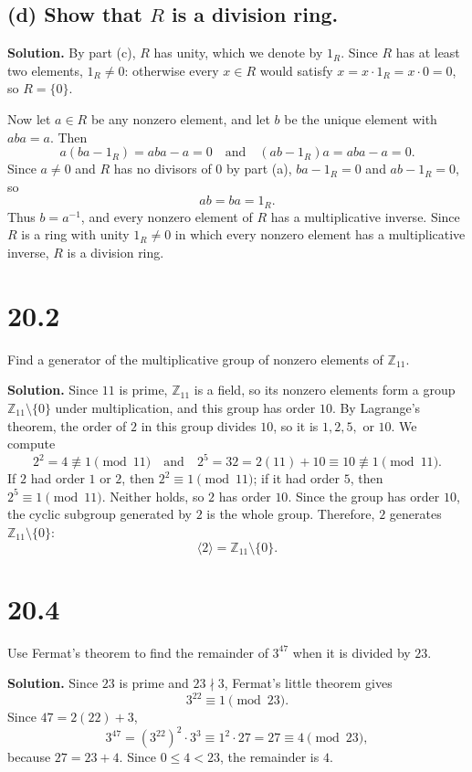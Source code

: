 \documentclass[11pt]{article}
\begin{document}
\subsection*{(d) Show that \(R\) is a division ring.}
\noindent\textbf{Solution.}
By part (c), \(R\) has unity, which we denote by \(1_R\).
Since \(R\) has at least two elements, \(1_R\neq0\): otherwise every
\(x\in R\) would satisfy \(x=x\cdot1_R=x\cdot0=0\), so \(R=\{0\}\).

Now let \(a\in R\) be any nonzero element, and let \(b\) be the unique
element with \(aba=a\). Then
\[
a(ba-1_R)=aba-a=0
\quad\text{and}\quad
(ab-1_R)a=aba-a=0.
\]
Since \(a\neq0\) and \(R\) has no divisors of \(0\) by part (a),
\(ba-1_R=0\) and \(ab-1_R=0\), so
\[
ab=ba=1_R.
\]
Thus \(b=a^{-1}\), and every nonzero element of \(R\) has a
multiplicative inverse. Since \(R\) is a ring with unity \(1_R\neq0\)
in which every nonzero element has a multiplicative inverse, \(R\) is a
division ring.

\section*{20.2}
Find a generator of the multiplicative group of nonzero elements
of \(\mathbb{Z}_{11}\).

\noindent\textbf{Solution.}
Since \(11\) is prime, \(\mathbb{Z}_{11}\) is a field, so its nonzero
elements form a group \(\mathbb{Z}_{11}\setminus\{0\}\) under
multiplication, and this group has order \(10\).
By Lagrange's theorem, the order of \(2\) in this group divides \(10\),
so it is \(1,2,5,\) or \(10\). We compute
\[
2^2=4\not\equiv1\pmod{11}
\quad\text{and}\quad
2^5=32=2(11)+10\equiv10\not\equiv1\pmod{11}.
\]
If \(2\) had order \(1\) or \(2\), then \(2^2\equiv1\pmod{11}\); if it had
order \(5\), then \(2^5\equiv1\pmod{11}\). Neither holds, so \(2\) has
order \(10\). Since the group has order \(10\), the cyclic subgroup
generated by \(2\) is the whole group. Therefore, \(2\) generates
\(\mathbb{Z}_{11}\setminus\{0\}\):
\[
\boxed{\langle 2\rangle=\mathbb{Z}_{11}\setminus\{0\}.}
\]

\section*{20.4}
Use Fermat's theorem to find the remainder of \(3^{47}\)
when it is divided by \(23\).

\noindent\textbf{Solution.}
Since \(23\) is prime and \(23\nmid3\), Fermat's little theorem gives
\[
3^{22}\equiv1\pmod{23}.
\]
Since \(47=2(22)+3\),
\[
3^{47}=(3^{22})^2\cdot 3^3
\equiv1^2\cdot27
=27
\equiv4\pmod{23},
\]
because \(27=23+4\). Since \(0\le4<23\), the remainder is
\(\boxed{4}\).
\end{document}
